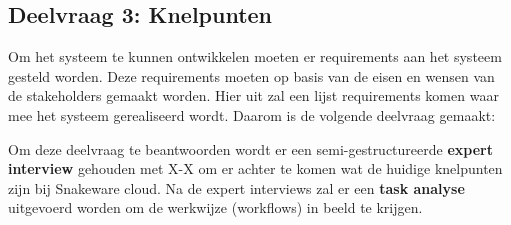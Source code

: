 \subsection{Deelvraag 3: Knelpunten}
Om het systeem te kunnen ontwikkelen moeten er requirements aan het systeem gesteld worden.
Deze requirements moeten op basis van de eisen en wensen van de stakeholders gemaakt worden.
Hier uit zal een lijst requirements komen waar mee het systeem gerealiseerd wordt.
Daarom is de volgende deelvraag gemaakt:

\begin{center}
    \textit{\SubquestionThree}
\end{center}

\whitespace[0.2]
Om deze deelvraag te beantwoorden wordt er een semi-gestructureerde \textbf{expert interview} gehouden met X-X om er achter te komen wat de huidige knelpunten zijn bij Snakeware cloud.
Na de expert interviews zal er een \textbf{task analyse} uitgevoerd worden om de werkwijze (workflows) in beeld te krijgen.
